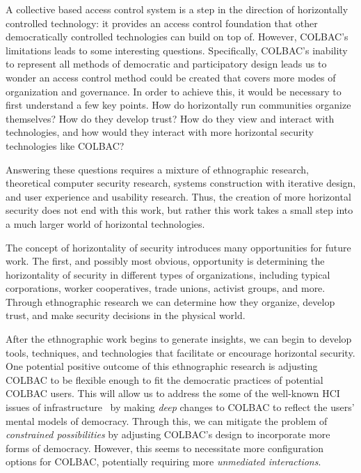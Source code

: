 A collective based access control system is a step in the direction of
horizontally controlled technology: it provides an access control foundation
that other democratically controlled technologies can build on top of. However,
COLBAC's limitations leads to some interesting questions. Specifically, COLBAC's
inability to represent all methods of democratic and participatory design leads
us to wonder an access control method could be created that covers more modes of
organization and governance. In order to achieve this, it would be necessary to
first understand a few key points. How do horizontally run communities organize
themselves? How do they develop trust? How do they view and interact with
technologies, and how would they interact with more horizontal security
technologies like COLBAC?

Answering these questions requires a mixture of ethnographic research,
theoretical computer security research, systems construction with iterative
design, and user experience and usability research. Thus, the creation of more
horizontal security does not end with this work, but rather this work takes a
small step into a much larger world of horizontal technologies.

The concept of horizontality of security introduces many opportunities for
future work. The first, and possibly most obvious, opportunity is determining
the horizontality of security in different types of organizations, including
typical corporations, worker cooperatives, trade unions, activist groups, and
more. Through ethnographic research we can determine how they organize, develop
trust, and make security decisions in the physical world.

After the ethnographic work begins to generate insights, we can begin to develop
tools, techniques, and technologies that facilitate or encourage horizontal
security. One potential positive outcome of this ethnographic research is
adjusting COLBAC to be flexible enough to fit the democratic practices of
potential COLBAC users. This will allow us to address the some of the well-known
HCI issues of infrastructure~\cite{edwards2010infrastructure} by making
\textit{deep} changes to COLBAC to reflect the users' mental models of
democracy. Through this, we can mitigate the problem of \textit{constrained
possibilities} by adjusting COLBAC's design to incorporate more forms of
democracy. However, this seems to necessitate more configuration options for
COLBAC, potentially requiring more \textit{unmediated interactions}. 

